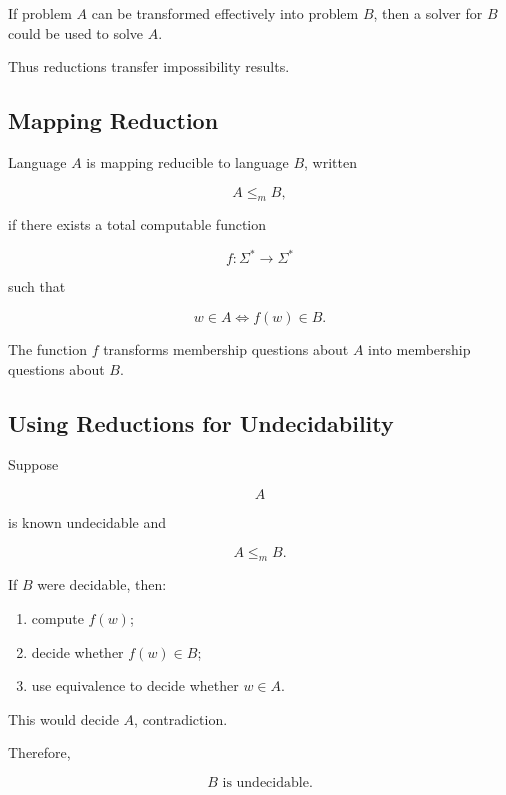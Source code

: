 If problem \(A\) can be transformed effectively into problem \(B\), then a
solver for \(B\) could be used to solve \(A\).

Thus reductions transfer impossibility results.

\subsection{Mapping Reduction}
\label{subsec:mapping-reduction}

Language \(A\) is mapping reducible to language \(B\), written

\[
\boxed{
A
\leq_m
B,
}
\]

if there exists a total computable function

\[
f:\Sigma^*\to\Sigma^*
\]

such that

\[
\boxed{
w\in A
\iff
f(w)\in B.
}
\]

The function \(f\) transforms membership questions about \(A\) into
membership questions about \(B\).

\subsection{Using Reductions for Undecidability}
\label{subsec:reductions-undecidability}

Suppose

\[
A
\]

is known undecidable and

\[
A\leq_m B.
\]

If \(B\) were decidable, then:

\begin{enumerate}
    \item compute \(f(w)\);
    \item decide whether \(f(w)\in B\);
    \item use equivalence to decide whether \(w\in A\).
\end{enumerate}

This would decide \(A\), contradiction.

Therefore,

\[
\boxed{
B
\text{ is undecidable}.
}
\]

